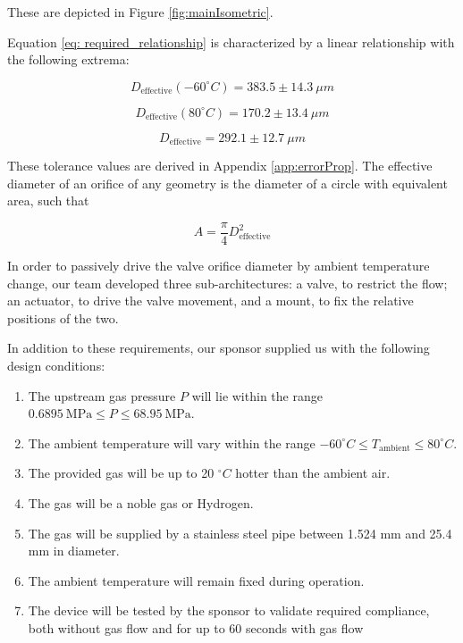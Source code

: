 \documentclass[12pt, letterpaper]{report}%
\newcounter{mycounter}           %
\newcounter{sub}[mycounter]      %
\newcommand{\degC}{^{\circ}C}    %
\newcommand{\coldBoundary}{D_{\text{effective}}(-60\degC) = 383.5 \pm 14.3\ \mu m}
\newcommand{\hotBoundary}{D_{\text{effective}}(80\degC) = 170.2 \pm 13.4\ \mu m}
\newcommand{\DTref}{D_{\text{effective}} = 292.1 \pm 12.7\ \mu m}
\newcommand{\specPressure}{68.95}%
\begin{document}
        These are depicted in Figure \ref{fig:mainIsometric}.

        Equation \eqref{eq: required_relationship} is characterized by a linear relationship with the following extrema:

        \begin{equation}
            \coldBoundary
            \label{eq: coldBoundary}
        \end{equation}
        
        \begin{equation}
            \hotBoundary
            \label{eq: hotBoundary}
        \end{equation}

        \begin{equation}
            \DTref
            \label{eq: DTref}
        \end{equation}

        These tolerance values are derived in Appendix \ref{app:errorProp}.
        The effective diameter of an orifice of any geometry is the diameter of a circle with equivalent area, such that
        
        \begin{equation}
            A = \frac{\pi}{4}D_{\text{effective}}^2
            \label{eq:d_eff}
        \end{equation}
        
        In order to passively drive the valve orifice diameter by ambient temperature change, 
        our team developed three sub-architectures:
        a valve, to restrict the flow;
        an actuator, to drive the valve movement,
        and a mount, to fix the relative positions of the two.

        In addition to these requirements, our sponsor supplied us with the following design conditions:
        
        \begin{enumerate}
            \item The upstream gas pressure $P$ will lie within the range $0.6895\ \text{MPa} \leq P \leq \specPressure\ \text{MPa}$.
            \item The ambient temperature will vary within the range $-60 \degC \leq T_{\text{ambient}} \leq 80 \degC$.
            \item The provided gas will be up to 20 $\degC$ hotter than the ambient air.
            \item The gas will be a noble gas or Hydrogen.
            \item The gas will be supplied by a stainless steel pipe between 1.524 mm and 25.4 mm in diameter.
            \item The ambient temperature will remain fixed during operation.
            \item The device will be tested by the sponsor to validate required compliance, both without gas flow and for up to 60 seconds with gas flow
        \end{enumerate} 
        
\end{document}
